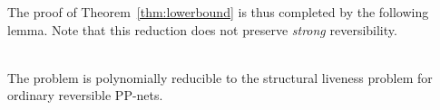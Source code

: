 \noindent
The proof of Theorem~\ref{thm:lowerbound} is thus completed by the following lemma.
Note that this reduction does not preserve \emph{strong}
reversibility.

\begin{lem}\label{lem:PPSCtoSLP}
\hfill\\
	The \PPSCover problem is polynomially reducible to the structural
	liveness problem for ordinary reversible PP-nets.
\end{lem}
\begin{figure}[t]
\begin{center}
\end{center}
\end{figure}
